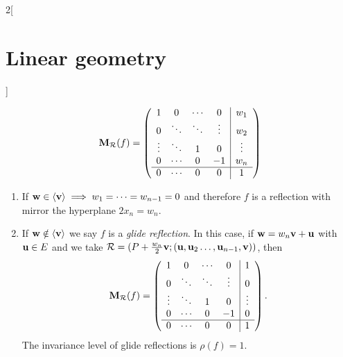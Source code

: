 \documentclass[../../../main.tex]{subfiles}
\begin{document}
\begin{multicols}{2}[\section{Linear geometry}]
\begin{proposition}
    $$\boldsymbol{\mathrm{M}}_\mathcal{R}(f)=\left(
      \begin{array}{cccc|c}
          1      & 0      & \cdots & 0      & w_1    \\
          0      & \ddots & \ddots & \vdots & w_2    \\
          \vdots & \ddots & 1      & 0      & \vdots \\
          0      & \cdots & 0      & -1     & w_n    \\
          \hline
          0      & \cdots & 0      & 0      & 1      \\
        \end{array}\right)$$
    \begin{enumerate}
      \item If $\boldsymbol{\mathrm{w}}\in\langle\boldsymbol{\mathrm{v}}\rangle\implies w_1=\cdots =w_{n-1}=0$ and therefore $f$ is a reflection with mirror the hyperplane $2x_n=w_n$.
      \item If $\boldsymbol{\mathrm{w}}\notin\langle\boldsymbol{\mathrm{v}}\rangle$ we say $f$ is a \emph{glide reflection}. In this case, if $\boldsymbol{\mathrm{w}}=w_n\boldsymbol{\mathrm{v}}+\boldsymbol{\mathrm{u}}$ with $\boldsymbol{\mathrm{u}}\in E$ and we take $\mathcal{R}=(P+\frac{w_n}{2}\boldsymbol{\mathrm{v}};(\boldsymbol{\mathrm{u}},\boldsymbol{\mathrm{u}}_2\ldots, \boldsymbol{\mathrm{u}}_{n-1},\boldsymbol{\mathrm{v}}))$, then $$\boldsymbol{\mathrm{M}}_\mathcal{R}(f)=\left(
              \begin{array}{cccc|c}
                  1      & 0      & \cdots & 0      & 1      \\
                  0      & \ddots & \ddots & \vdots & 0      \\
                  \vdots & \ddots & 1      & 0      & \vdots \\
                  0      & \cdots & 0      & -1     & 0      \\
                  \hline
                  0      & \cdots & 0      & 0      & 1      \\
                \end{array}\right).$$ The invariance level of glide reflections is $\rho(f)=1$.
    \end{enumerate}
  \end{proposition}

\end{multicols}
\end{document}
